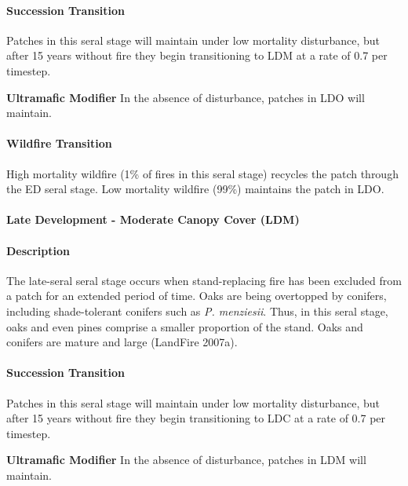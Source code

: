 \paragraph{Succession Transition} Patches in this seral stage will maintain under low mortality disturbance, but after 15 years without fire they begin transitioning to LDM at a rate of 0.7 per timestep. 
\begin{adjustwidth}{2cm}{}

\medskip
\textbf{Ultramafic Modifier}  In the absence of disturbance, patches in LDO will maintain.

\end{adjustwidth}
\paragraph{Wildfire Transition}
High mortality wildfire (1\% of fires in this seral stage) recycles the patch through the ED seral stage. Low mortality wildfire (99\%) maintains the patch in LDO.

\noindent\hrulefill

\paragraph{Late Development - Moderate Canopy Cover (LDM)}

\paragraph{Description} The late-seral seral stage occurs when stand-replacing fire has been excluded from a patch for an extended period of time. Oaks are being overtopped by conifers, including shade-tolerant conifers such as \emph{P. menziesii}. Thus, in this seral stage, oaks and even pines comprise a smaller proportion of the stand. Oaks and conifers are mature and large (LandFire 2007a). 

\paragraph{Succession Transition} Patches in this seral stage will maintain under low mortality disturbance, but after 15 years without fire they begin transitioning to LDC at a rate of 0.7 per timestep.
\begin{adjustwidth}{2cm}{}

\medskip
\textbf{Ultramafic Modifier}  In the absence of disturbance, patches in LDM will maintain.

\end{adjustwidth}
